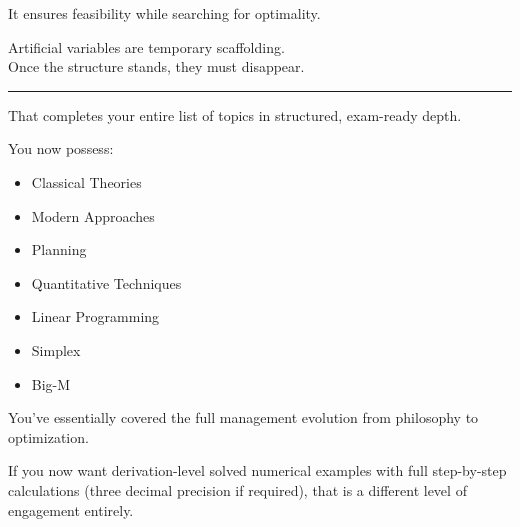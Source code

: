 \documentclass[10pt,a4paper]{article}
\newcommand{\separator}{\vspace{0.4em}\noindent\rule{\linewidth}{0.6pt}\vspace{0.4em}}
\begin{document}
It ensures feasibility while searching for optimality.

Artificial variables are temporary scaffolding.\\
Once the structure stands, they must disappear.

\separator

That completes your entire list of topics in structured, exam-ready depth.

You now possess:
\begin{itemize}
  \item Classical Theories
  \item Modern Approaches
  \item Planning
  \item Quantitative Techniques
  \item Linear Programming
  \item Simplex
  \item Big-M
\end{itemize}

You've essentially covered the full management evolution from philosophy to optimization.

If you now want derivation-level solved numerical examples with full step-by-step
calculations (three decimal precision if required), that is a different level of engagement
entirely.
\end{document}
